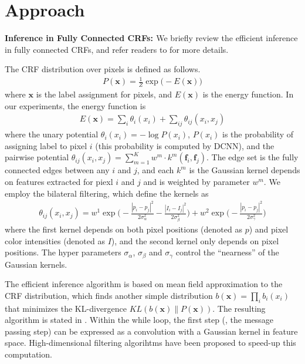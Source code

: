\section{Approach}

{\bf{Inference in Fully Connected CRFs: }} We briefly review the efficient inference in fully connected CRFs, and refer readers to \citep{krahenbuhl2011efficient} for more details. 

The CRF distribution over pixels is defined as follows.
\begin{align}
  P(\boldsymbol{x}) = \frac{1}{Z} \exp \Big(-E(\boldsymbol{x})\Big)
\end{align}
where $\boldsymbol{x}$ is the label assignment for pixels, and $E(\boldsymbol{x})$ is the energy function. In our experiments, the energy function is
\begin{align}
  E(\boldsymbol{x}) = \sum_i \theta_i(x_i) + \sum_{ij} \theta_{ij}(x_i, x_j)
\end{align}
where the unary potential $\theta_i(x_i) = - \log P(x_i)$, $P(x_i)$ is the probability of assigning label to pixel $i$ (this probability is computed by DCNN), and the pairwise potential $\theta_{ij}(x_i, x_j) = \sum_{m=1}^{K} w^m \cdot k^m(\boldsymbol{f}_i, \boldsymbol{f}_j)$. The edge set is the fully connected edges between any $i$ and $j$, and each $k^m$ is the Gaussian kernel depends on features extracted for piexl $i$ and $j$ and is weighted by parameter $w^m$. We employ the bilateral filtering, which define the kernels as 
\begin{align}
  \theta_{ij}(x_i, x_j) = w^1 \exp \Big(-\frac{|p_i-p_j|^2}{2\sigma_\alpha^2} -\frac{|I_i-I_j|^2}{2\sigma_\beta^2} \Big) + w^2 \exp \Big(-\frac{|p_i-p_j|^2}{2\sigma_\gamma^2}\Big)
\end{align}
where the first kernel depends on both pixel positions (denoted as $p$) and pixel color intensities (denoted as $I$), and the second kernel only depends on pixel positions. The hyper parameters $\sigma_\alpha$, $\sigma_\beta$ and $\sigma_\gamma$ control the ``nearness'' of the Gaussian kernels.

The efficient inference algorithm is based on mean field approximation to the CRF distribution, which finds another simple distribution $b(\boldsymbol{x}) = \prod_i b_i(x_i)$ that minimizes the KL-divergence $KL(b(\boldsymbol{x}) \| P(\boldsymbol{x}))$. The resulting algorithm is stated in . Within the while loop, the first step (\ie, the message passing step) can be expressed as a convolution with a Gaussian kernel in feature space. High-dimensional filtering algorihtms \citep{adams2010fast} have been proposed to speed-up this computation.

